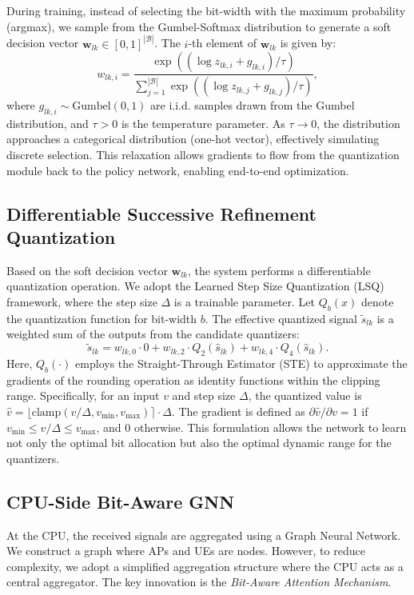 During training, instead of selecting the bit-width with the maximum probability (argmax), we sample from the Gumbel-Softmax distribution to generate a soft decision vector $\mathbf{w}_{lk} \in [0, 1]^{|\mathcal{B}|}$. The $i$-th element of $\mathbf{w}_{lk}$ is given by:
\begin{equation}
    w_{lk, i} = \frac{\exp((\log z_{lk, i} + g_{lk, i}) / \tau)}{\sum_{j=1}^{|\mathcal{B}|} \exp((\log z_{lk, j} + g_{lk, j}) / \tau)},
\end{equation}
where $g_{lk, i} \sim \text{Gumbel}(0, 1)$ are i.i.d. samples drawn from the Gumbel distribution, and $\tau > 0$ is the temperature parameter. As $\tau \to 0$, the distribution approaches a categorical distribution (one-hot vector), effectively simulating discrete selection. This relaxation allows gradients to flow from the quantization module back to the policy network, enabling end-to-end optimization.

\subsection{Differentiable Successive Refinement Quantization}
Based on the soft decision vector $\mathbf{w}_{lk}$, the system performs a differentiable quantization operation. We adopt the Learned Step Size Quantization (LSQ) framework, where the step size $\Delta$ is a trainable parameter. Let $Q_b(x)$ denote the quantization function for bit-width $b$. The effective quantized signal $\tilde{s}_{lk}$ is a weighted sum of the outputs from the candidate quantizers:
\begin{equation}
    \tilde{s}_{lk} = w_{lk, 0} \cdot 0 + w_{lk, 2} \cdot Q_2(\hat{s}_{lk}) + w_{lk, 4} \cdot Q_4(\hat{s}_{lk}).
\end{equation}
Here, $Q_b(\cdot)$ employs the Straight-Through Estimator (STE) to approximate the gradients of the rounding operation as identity functions within the clipping range. Specifically, for an input $v$ and step size $\Delta$, the quantized value is $\hat{v} = \lfloor \text{clamp}(v/\Delta, v_{\min}, v_{\max}) \rceil \cdot \Delta$. The gradient is defined as $\partial \hat{v} / \partial v = 1$ if $v_{\min} \le v/\Delta \le v_{\max}$, and 0 otherwise. This formulation allows the network to learn not only the optimal bit allocation but also the optimal dynamic range for the quantizers.

\subsection{CPU-Side Bit-Aware GNN}
At the CPU, the received signals are aggregated using a Graph Neural Network. We construct a graph where APs and UEs are nodes. However, to reduce complexity, we adopt a simplified aggregation structure where the CPU acts as a central aggregator. The key innovation is the \textit{Bit-Aware Attention Mechanism}.

